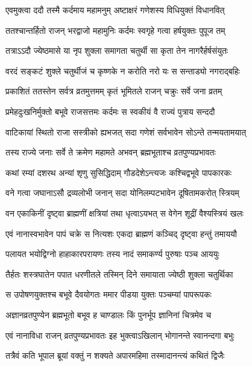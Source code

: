 \twolineshloka
{एवमुक्त्वा ददौ तस्मै कर्दमाय महामनुम्}
{अष्टाक्षरं गणेशस्य विधियुक्तं विधानवित्} %

\twolineshloka
{ततश्चान्तर्हितो राजन् भरद्वाजो महामुनिः}
{कर्दमः स्वगृहे गत्वा हर्षयुक्तः पुपूज तम्} %

\twolineshloka
{तत्राऽऽदौ ज्येष्ठमासे या नृप शुक्ला समागता}
{चतुर्थी सा कृता तेन नागरैर्हर्षसंयुतः} %

\twolineshloka
{वरदं सङ्कटं शुक्ले चतुर्थीजं च कृष्णके}
{न करोति नरो यः स सन्ताड्यो नगराद्बहिः} %

\twolineshloka
{प्रकाशितं ततस्तेन सर्वत्र व्रतमुत्तमम्}
{कृतं भूमितले राजन् चक्रुः सर्वे जना व्रतम्} %

\twolineshloka
{प्रमेहदुःखनिर्मुक्तो बभूवे राजसत्तमः}
{कर्दमः स स्वकीयं वै राज्यं पुत्राय सन्ददौ} %

\twolineshloka
{वाटिकायां स्थितो राजा सस्त्रीको ह्यभजत् सदा}
{गणेशं सर्वभावेन सोऽन्ते तन्मयतामयात्} %

\twolineshloka
{तस्य राज्ये जनाः सर्वे ते क्रमेण महामते}
{अभवन् ब्रह्मभूताश्च व्रतपुण्यप्रभावतः} %

\twolineshloka
{कथां रम्यां दशरथ अन्यां श‍ृणु सुसिद्धिदाम्}
{गौडदेशेऽन्त्यजः कश्चिद्वभूवे पापकारकः} %

\twolineshloka
{वने गत्वा जघानाऽसौ द्रव्यलोभी जनान् सदा}
{योनिलम्पटभावेन दूषितामकरोत् स्त्रियम्} %

\twolineshloka
{वन एकाकिनीं दृष्ट्वा ब्राह्मणीं क्षत्रियां तथा}
{धृत्वाऽयभत् स वेगेन शूद्रीं वैश्यस्त्रियं खलः} %

\twolineshloka
{एवं नानास्वभावेन पापं चक्रे स नित्यशः}
{एकदा ब्राह्मणं कञ्चिद् दृष्ट्वा हन्तुं तमाययौ} %

\twolineshloka
{पलायत भयोद्विग्नो हाहाकारपरायणः}
{तस्य नादं समाकर्ण्य पुरुषाः पञ्च आययुः} %

\twolineshloka
{तैर्हतः शस्त्रघातेन पपात धरणीतले}
{तस्मिन् दिने समायाता ज्येष्ठी शुक्ला चतुर्थिका} %

\twolineshloka
{स उपोषणयुक्तश्च बभूवे दैवयोगतः}
{ममार पीडया युक्तः पञ्चम्यां पापरूपकः} %

\twolineshloka
{अज्ञानव्रतपुण्येन ब्रह्मभूतो बभूव ह}
{चाण्डालः किं पुनर्भूप ज्ञानिनां चित्रमेव च} %

\twolineshloka
{एवं नानाविधा राजन् व्रतपुण्यप्रभावतः}
{इह भुक्त्वाऽखिलान् भोगानन्ते स्वानन्दगा बभुः} %

\twolineshloka
{तत्रैवं कति भूपाल ब्रूयां वक्तुं न शक्यते}
{अपारमहिमा तस्मादानन्त्यं कथितं द्विजैः} %

